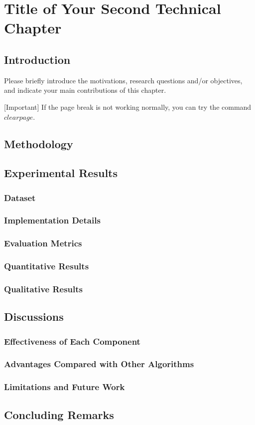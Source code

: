 \chapter{Title of Your Second Technical Chapter}
\label{chap:chapter_4}

\section{Introduction}


Please briefly introduce the motivations, research questions and/or objectives, and indicate your main contributions of this chapter.

[Important] If the page break is not working normally, you can try the command $clearpage$.

\clearpage

\section{Methodology}

\section{Experimental Results}

\subsection{Dataset}
\subsection{Implementation Details}
\subsection{Evaluation Metrics}
\subsection{Quantitative Results}
\subsection{Qualitative Results}


\section{Discussions}
\subsection{Effectiveness of Each Component}
\subsection{Advantages Compared with Other Algorithms}

\subsection{Limitations and Future Work}

\section{Concluding Remarks}

